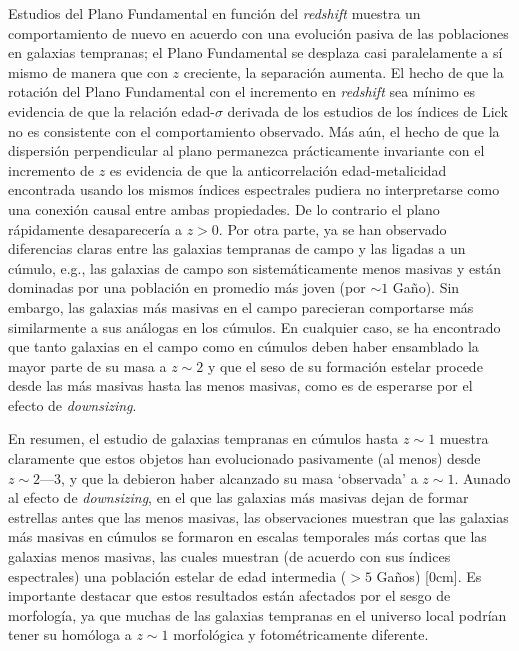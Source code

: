 \documentclass[a4paper,twoside]{article}
\begin{document}
Estudios del Plano Fundamental en función del \emph{redshift} muestra un comportamiento de nuevo en acuerdo con una evolución pasiva de las poblaciones en galaxias tempranas; el Plano Fundamental se desplaza casi paralelamente a sí mismo de manera que con $z$ creciente, la separación aumenta. El hecho de que la rotación del Plano Fundamental con el incremento en \emph{redshift} sea mínimo es evidencia de que la relación edad-$\sigma$ derivada de los estudios de los índices de Lick no es consistente con el comportamiento observado. Más aún, el hecho de que la dispersión perpendicular al plano permanezca prácticamente invariante con el incremento de $z$ es evidencia de que la anticorrelación edad-metalicidad encontrada usando los mismos índices espectrales pudiera no interpretarse como una conexión causal entre ambas propiedades. De lo contrario el plano rápidamente desaparecería a $z>0$. Por otra parte, ya se han observado diferencias claras entre las galaxias tempranas de campo y las ligadas a un cúmulo, e.g., las galaxias de campo son sistemáticamente menos masivas y están dominadas por una población en promedio más joven (por $\sim1$ Gaño). Sin embargo, las galaxias más masivas en el campo parecieran comportarse más similarmente a sus análogas en los cúmulos. En cualquier caso, se ha encontrado que tanto galaxias en el campo como en cúmulos deben haber ensamblado la mayor parte de su masa a $z\sim2$ y que el seso de su formación estelar procede desde las más masivas hasta las menos masivas, como es de esperarse por el efecto de \emph{downsizing}.

En resumen, el estudio de galaxias tempranas en cúmulos hasta $z\sim1$ muestra claramente que estos objetos han evolucionado pasivamente (al menos) desde $z\sim2$---$3$, y que la debieron haber alcanzado su masa `observada' a $z\sim1$. Aunado al efecto de \emph{downsizing}, en el que las galaxias más masivas dejan de formar estrellas antes que las menos masivas, las observaciones muestran que las galaxias más masivas en cúmulos se formaron en escalas temporales más cortas que las galaxias menos masivas, las cuales muestran (de acuerdo con sus índices espectrales) una población estelar de edad intermedia ($>5$ Gaños) [0cm]. Es importante destacar que estos resultados están afectados por el sesgo de morfología, ya que muchas de las galaxias tempranas en el universo local podrían tener su homóloga a $z\sim1$ morfológica y fotométricamente diferente.
\end{document}
